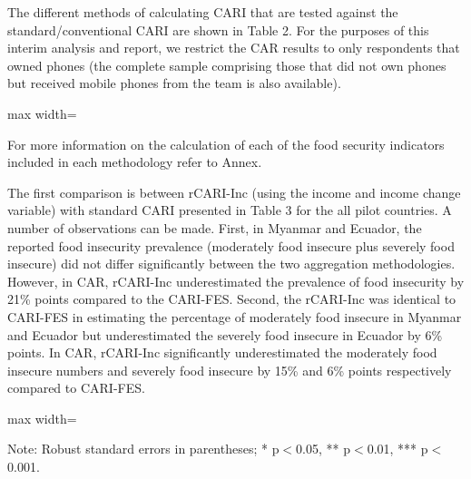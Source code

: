 \documentclass[11pt,harvard]{article}
\begin{document}
The different methods of calculating CARI that are tested against the standard/conventional CARI are shown in Table 2. For the purposes of this interim analysis and report, we restrict the CAR results to only respondents that owned phones (the complete sample comprising those that did not own phones but received mobile phones from the team is also available).  


\begin{table}[htbp]
	\centering
	\begin{adjustbox}{max width=\textwidth}
		\begin{threeparttable}
			\caption{Lists the different aggregation methods and indicators used for each methodology}
			\scriptsize
			 
			\label{tab:Aggregation_Table}
		\end{threeparttable}
	\end{adjustbox}
\end{table}
 
 For more information on the calculation of each of the food security indicators included in each methodology refer to Annex. 
 
The first comparison is between rCARI-Inc (using the income and income change variable) with standard CARI presented in Table 3 for the all pilot countries. A number of observations can be made. First, in Myanmar and Ecuador, the reported food insecurity prevalence (moderately food insecure plus severely food insecure) did not differ significantly between the two aggregation methodologies. However, in CAR, rCARI-Inc underestimated the prevalence of food insecurity by 21\% points compared to the CARI-FES. Second, the rCARI-Inc was identical to CARI-FES in estimating the percentage of moderately food insecure in Myanmar and Ecuador but underestimated the severely food insecure in Ecuador by 6\% points. In CAR, rCARI-Inc significantly underestimated the moderately food insecure numbers and severely food insecure by 15\% and 6\% points respectively compared to CARI-FES.
 
\begin{table}[htbp]
	\centering
	\begin{adjustbox}{max width=\textwidth}
		\begin{threeparttable}
			\caption{Impact of Survey Modality: Standard CARI-FES vs. Standard rCARI-Inc}
			\scriptsize
			 
			\label{tab:CARI_rCARI_Modality_All_Country}
			\begin{tablenotes}
				\item Note: Robust standard errors in parentheses; * p$<$0.05, ** p$<$0.01, *** p$<$0.001. 
			\end{tablenotes}
		\end{threeparttable}
	\end{adjustbox}
\end{table}
\end{document}
